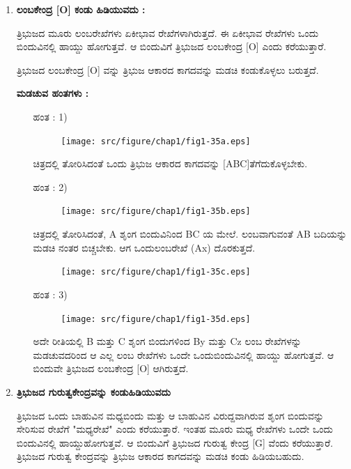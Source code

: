  \begin{enumerate}
    \item \textbf{ಲಂಬಕೇಂದ್ರ [O] ಕಂಡು ಹಿಡಿಯುವದು :}
 
 ತ್ರಿಭುಜದ ಮೂರು ಲಂಬರೇಖೆಗಳು ಏಕೀಭಾವ ರೇಖೆಗಳಾಗಿರುತ್ತದೆ. ಈ ಏಕೀಭಾವ ರೇಖೆಗಳು ಒಂದು ಬಿಂದುವಿನಲ್ಲಿ ಹಾಯ್ದು ಹೋಗುತ್ತವೆ. ಆ ಬಿಂದುವಿಗೆ ತ್ರಿಭುಜದ ಲಂಬಕೇಂದ್ರ [O] ಎಂದು ಕರೆಯುತ್ತಾರೆ. 
 
 ತ್ರಿಭುಜದ ಲಂಬಕೇಂದ್ರ [O] ವನ್ನು ತ್ರಿಭುಜ ಆಕಾರದ ಕಾಗದವನ್ನು ಮಡಚಿ ಕಂಡುಕೊಳ್ಳಲು ಬರುತ್ತದೆ. 
 
 
    \noindent
 \textbf{ಮಡಚುವ ಹಂತಗಳು :}
 
 \begin{itemize}
 \item[ಹಂತ : 1)]
 ~
 \begin{figure}[H]
\centering
\texttt{[image: src/figure/chap1/fig1-35a.eps]}
\end{figure}
 
 ಚಿತ್ರದಲ್ಲಿ ತೋರಿಸಿದಂತೆ ಒಂದು ತ್ರಿಭುಜ ಆಕಾರದ ಕಾಗದವನ್ನು [ABC]\break ತೆಗೆದುಕೊಳ್ಳಬೇಕು. 
 
 \item[ಹಂತ : 2)] 
 ~
 \begin{figure}[H]
\centering
\texttt{[image: src/figure/chap1/fig1-35b.eps]}
\end{figure}
 
 ಚಿತ್ರದಲ್ಲಿ ತೋರಿಸಿದಂತೆ, A ಶೃಂಗ ಬಿಂದುವಿನಿಂದ BC ಯ ಮೇಲೆ. ಲಂಬ\break ವಾಗುವಂತೆ AB ಬದಿಯನ್ನು ಮಡಚಿ ನಂತರ ಬಿಚ್ಚಬೇಕು. ಆಗ ಒಂದು\break  ಲಂಬರೇಖೆ (Ax) ದೊರಕುತ್ತದೆ. 
 \begin{figure}[H]
\centering
\texttt{[image: src/figure/chap1/fig1-35c.eps]}
\end{figure}
 
 \item[ಹಂತ : 3)] 
  ~
  \begin{figure}[H]
\centering
\texttt{[image: src/figure/chap1/fig1-35d.eps]}
\end{figure}
 
 ಅದೇ ರೀತಿಯಲ್ಲಿ  B ಮತ್ತು C ಶೃಂಗ ಬಿಂದುಗಳಿಂದ By ಮತ್ತು  Cz ಲಂಬ ರೇಖೆಗಳನ್ನು ಮಡಚುವದರಿಂದ ಆ  ಎಲ್ಲ ಲಂಬ ರೇಖೆಗಳು ಒಂದೇ ಒಂದು\break ಬಿಂದುವಿನಲ್ಲಿ ಹಾಯ್ದು ಹೋಗುತ್ತವೆ. ಆ ಬಿಂದುವೇ ತ್ರಿಭುಜದ ಲಂಬ\break ಕೇಂದ್ರ  [O] ಆಗಿರುತ್ತದೆ. 
  \end{itemize}
 
 \item \textbf{ತ್ರಿಭುಜದ ಗುರುತ್ವಕೇಂದ್ರವನ್ನು ಕಂಡುಹಿಡಿಯುವದು }
 
 ತ್ರಿಭುಜದ ಒಂದು ಬಾಹುವಿನ ಮಧ್ಯಬಿಂದು ಮತ್ತು ಆ ಬಾಹುವಿನ ವಿರುದ್ದವಾಗಿರುವ ಶೃಂಗ ಬಿಂದುವನ್ನು ಸೇರಿಸುವ ರೇಖೆಗೆ "ಮಧ್ಯರೇಖೆ" ಎಂದು ಕರೆಯುತ್ತಾರೆ. ಇಂತಹ ಮೂರು ಮಧ್ಯ ರೇಖೆಗಳು ಒಂದೇ ಒಂದು ಬಿಂದುವಿನಲ್ಲಿ ಹಾಯ್ದು\break ಹೋಗುತ್ತವೆ. ಆ ಬಿಂದುವಿಗೆ ತ್ರಿಭುಜದ ಗುರುತ್ವ ಕೇಂದ್ರ [G] ವೆಂದು ಕರೆಯುತ್ತಾರೆ. ತ್ರಿಭುಜದ ಗುರುತ್ವ ಕೇಂದ್ರವನ್ನು ತ್ರಿಭುಜ ಆಕಾರದ ಕಾಗದವನ್ನು ಮಡಚಿ ಕಂಡು ಹಿಡಿಯಬಹುದು. 
 

\end{enumerate}
